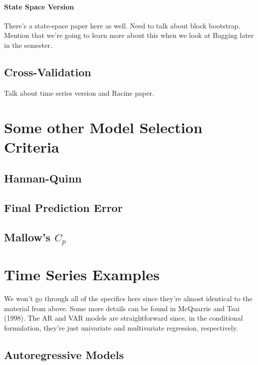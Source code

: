 \documentclass[12pt]{article}
\theoremstyle{definition}
\begin{document}
\paragraph{State Space Version}
There's a state-space paper here as well. Need to talk about block bootstrap. Mention that we're going to learn more about this when we look at Bagging later in the semester.

\subsection{Cross-Validation}
Talk about time series version and Racine paper.

\section{Some other Model Selection Criteria}
\subsection{Hannan-Quinn}
\subsection{Final Prediction Error}
\subsection{Mallow's $C_p$}




\section{Time Series Examples}
We won't go through all of the specifics here since they're almost identical to the material from above. Some more details can be found in
McQuarrie and Tsai (1998). The AR and VAR models are straightforward since, in the conditional formulation, they're just univariate and multivariate regression, respectively.

\subsection{Autoregressive Models}
\end{document}
